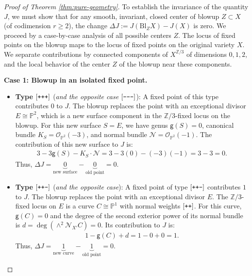 \documentclass[12pt,a4paper]{amsart}
\theoremstyle{definition}
\theoremstyle{remark}
\newcommand{\Z}{\mathbb{Z}}
\newcommand{\lp}{\textup{\texttt{+}}}
\newcommand{\lm}{\textup{\texttt{-}}}
\begin{document}
\begin{proof}[Proof of Theorem \ref{thm:pure-geometry}]
To establish the invariance of the quantity $J$, we must show that for any smooth, invariant, closed center of blowup $Z \subset X$ (of codimension $r \geq 2$), the change $\Delta J:= J(\mathrm{Bl}_Z X) - J(X)$ is zero. We proceed by a case-by-case analysis of all possible centers $Z$. The locus of fixed points on the blowup maps to the locus of fixed points on the original variety $X$. We separate contributions by connected components of $X^{\Z/3}$ of dimensions $0,1,2$, and the local behavior of the center $Z$ of the blowup near these components. 

\noindent \textbf{Case 1: Blowup in an isolated fixed point.}

\begin{itemize}
    \item \textbf{Type $[\lp\lp\lp]$} (\textit{and the opposite case  $[\lm\lm\lm]$}): A fixed point of this type contributes $0$ to $J$. The blowup replaces the point with an exceptional divisor $E \cong \mathbb{P}^2$, which is a new surface component in the $\mathbb Z/3$-fixed locus on the blowup. For this new surface $S=E$, we have genus $\mathsf{g}(S)=0$, canonical bundle $K_S = \mathcal{O}_{\mathbb{P}^2}(-3)$, and normal bundle $\mathcal{N}=\mathcal{O}_{\mathbb{P}^2}(-1)$. The contribution of this new surface to $J$ is:
    \begin{align}
        3 - 3\mathsf{g}(S) - K_S \cdot \mathcal{N} = 3 - 3(0) - (-3)(-1) = 3 - 3 = 0.
    \end{align}
    Thus, $\Delta J = \underbrace{0}_{\text{new surface}} - \underbrace{0}_{\text{old point}} = 0$.

    \item \textbf{Type $[\lp\lp\lm]$} (\textit{and the opposite case}): A fixed point of type $[\lp\lp\lm]$ contributes $1$ to $J$. The blowup replaces the point with an exceptional divisor $E$. The $\mathbb Z/3$-fixed locus on $E$ is a curve $C \cong \mathbb{P}^1$ with normal weights $[\lp\lp]$. For this curve, $\mathsf{g}(C) = 0$ and the degree of the second exterior power of its normal bundle is $d = \deg(\wedge^2 \mathcal{N}_{X'}C) = 0$. Its contribution to $J$ is:
    \begin{align}
        1 - \mathsf{g}(C) + d = 1 - 0 + 0 = 1.
    \end{align}
    Thus, $\Delta J = \underbrace{1}_{\text{new curve}} - \underbrace{1}_{\text{old point}} = 0$.
\end{itemize}


\end{proof}
\end{document}
